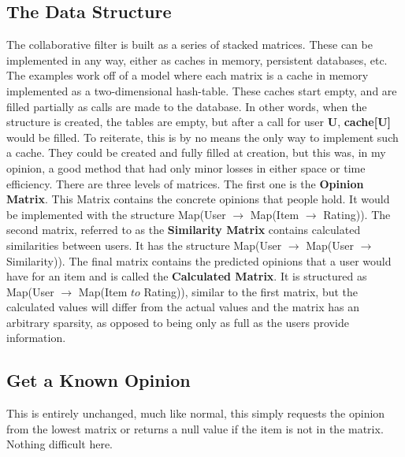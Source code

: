 \documentclass[12pt]{article}
\begin{document}
  \subsection{The Data Structure}

  \indent\indent The collaborative filter is built as a series of stacked matrices.  These can be implemented in any way, either as caches in memory, persistent databases, etc.  The examples work off of a model where each matrix is a cache in memory implemented as a two-dimensional hash-table.  These caches start empty, and are filled partially as calls are made to the database.  In other words, when the structure is created, the tables are empty, but after a call for user \textbf{U}, \textbf{cache[U]} would be filled.
  \p To reiterate, this is by no means the only way to implement such a cache.  They could be created and fully filled at creation, but this was, in my opinion, a good method that had only minor losses in either space or time efficiency.
  \p There are three levels of matrices.  The first one is the \textbf{Opinion Matrix}.  This Matrix contains the concrete opinions that people hold.  It would be implemented with the structure Map(User $\to$ Map(Item $\to$ Rating)).  
  \p The second matrix, referred to as the \textbf{Similarity Matrix} contains calculated similarities between users.  It has the structure Map(User $\to$ Map(User $\to$ Similarity)).  
  \p The final matrix contains the predicted opinions that a user would have for an item and is called the \textbf{Calculated Matrix}.  It is structured as Map(User $\to$ Map(Item $to$ Rating)), similar to the first matrix, but the calculated values will differ from the actual values and the matrix has an arbitrary sparsity, as opposed to being only as full as the users provide information.

  \subsection{Get a Known Opinion}
  \indent\indent This is entirely unchanged, much like normal, this simply requests the opinion from the lowest matrix or returns a null value if the item is not in the matrix.  Nothing difficult here.
\end{document}
